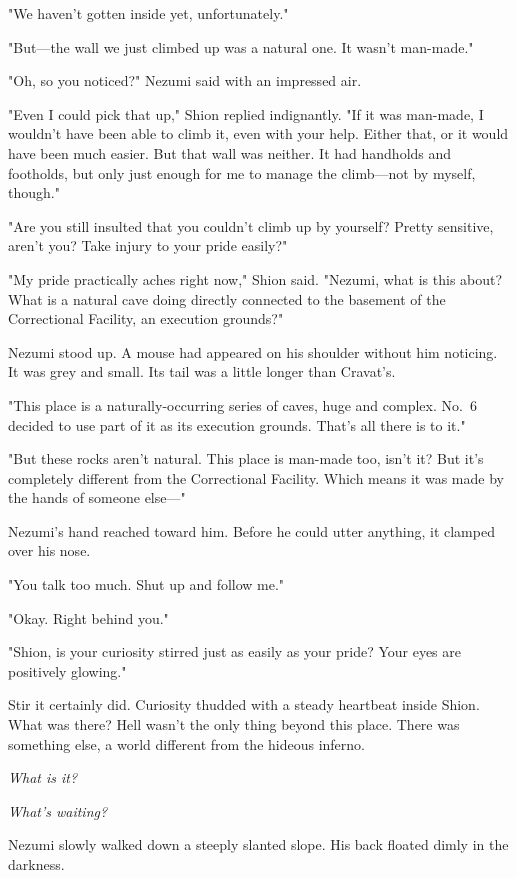 "We haven't gotten inside yet, unfortunately."

"But---the wall we just climbed up was a natural one. It wasn't man-made."

"Oh, so you noticed?" Nezumi said with an impressed air.

"Even I could pick that up," Shion replied indignantly. "If it was
man-made, I wouldn't have been able to climb it, even with your help.
Either that, or it would have been much easier. But that wall was
neither. It had handholds and footholds, but only just enough for me to
manage the climb---not by myself, though."

"Are you still insulted that you couldn't climb up by yourself? Pretty
sensitive, aren't you? Take injury to your pride easily?"

"My pride practically aches right now," Shion said. "Nezumi, what is
this about? What is a natural cave doing directly connected to the
basement of the Correctional Facility, an execution grounds?"

Nezumi stood up. A mouse had appeared on his shoulder without him
noticing. It was grey and small. Its tail was a little longer than
Cravat's.

"This place is a naturally-occurring series of caves, huge and complex.
No.~6 decided to use part of it as its execution grounds. That's all
there is to it."

"But these rocks aren't natural. This place is man-made too, isn't it?
But it's completely different from the Correctional Facility. Which
means it was made by the hands of someone else---"

Nezumi's hand reached toward him. Before he could utter anything, it
clamped over his nose.

"You talk too much. Shut up and follow me."

"Okay. Right behind you."

"Shion, is your curiosity stirred just as easily as your pride? Your
eyes are positively glowing."

Stir it certainly did. Curiosity thudded with a steady heartbeat inside
Shion. What was there? Hell wasn't the only thing beyond this place.
There was something else, a world different from the hideous inferno.

\emph{What is it?}

\emph{What's waiting?}

Nezumi slowly walked down a steeply slanted slope. His back floated
dimly in the darkness.

